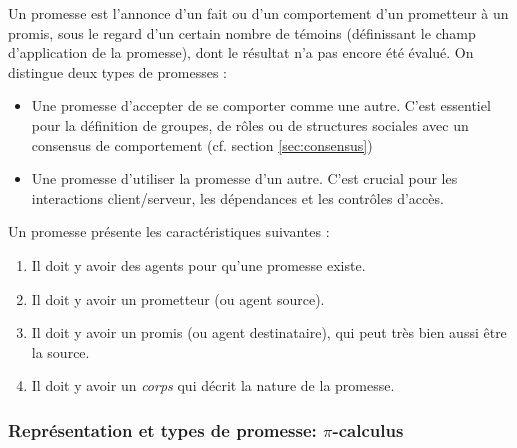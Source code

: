 Un promesse est l'annonce d'un fait ou d'un comportement d'un prometteur à un
promis, sous le regard d'un certain nombre de témoins (définissant le champ
d'application de la promesse), dont le résultat n'a pas encore été évalué.  On
distingue deux types de promesses :

\begin{itemize}
    \item Une promesse d'accepter de se comporter comme une autre. C'est
        essentiel pour la définition de groupes, de rôles ou de structures
        sociales avec un consensus de comportement (cf. section
        \ref{sec:consensus})
    \item Une promesse d'utiliser la promesse d'un autre. C'est crucial pour les
        interactions client/serveur, les dépendances et les contrôles d'accès.
\end{itemize}

Un promesse présente les caractéristiques suivantes :

\begin{enumerate}
    \item Il doit y avoir des agents pour qu'une promesse existe.
    \item Il doit y avoir un prometteur (ou agent source).
    \item Il doit y avoir un promis (ou agent destinataire), qui peut très bien
        aussi être la source.
    \item Il doit y avoir un \emph{corps} qui décrit la nature de la promesse.
\end{enumerate}

\subsubsection{Représentation et types de promesse: $\pi$-calculus}

